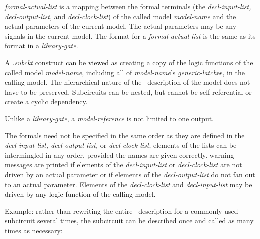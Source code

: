 {\begin{pespace}
\begin{description}
\item {\em formal-actual-list} is a mapping between the formal terminals
(the {\em decl-input-list, decl-output-list,} and {\em decl-clock-list}) of
the called model {\em model-name} and the actual parameters of the current
model.  The actual parameters may be any signals in the current model.  The
format for a {\em formal-actual-list} is the same as its format in a {\em
library-gate}.
\end{description}

A {\em .subckt} construct can be viewed as creating a copy of the logic
functions of the called model {\em model-name}, including all of {\em
model-name}'s {\em generic-latch}es, in the calling model.  The hierarchical
nature of the \BLIF\ description of the model does not have to be
preserved.  Subcircuits can be nested, but cannot be self-referential or
create a cyclic dependency.

Unlike a {\em library-gate}, a {\em model-reference} is not limited to one
output.  

The formals need not be specified in the same order as they are defined in
the {\em decl-input-list, decl-output-list,} or {\em decl-clock-list};
elements of the lists can be intermingled in any order, provided the names
are given correctly.  warning messages are printed if elements of the {\em
decl-input-list} or {\em decl-clock-list} are not driven by an actual
parameter or if elements of the {\em decl-output-list} do not fan out to an
actual parameter.  Elements of the {\em decl-clock-list} and {\em
decl-input-list} may be driven by any logic function of the calling model.

Example: rather than rewriting the entire \BLIF\ description for a commonly
used subcircuit several times, the subcircuit can be described once and
called as many times as necessary:
    

\end{pespace}}
